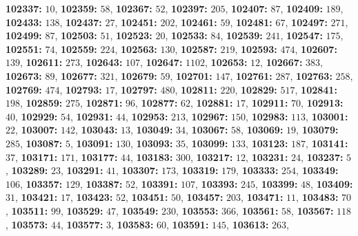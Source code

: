 \textsf{\bfseries 102337:} $10$, \textsf{\bfseries 102359:} $58$, \textsf{\bfseries 102367:} $52$, \textsf{\bfseries 102397:} $205$, \textsf{\bfseries 102407:} $87$, \textsf{\bfseries 102409:} $189$, \textsf{\bfseries 102433:} $138$, \textsf{\bfseries 102437:} $27$, \textsf{\bfseries 102451:} $202$, \textsf{\bfseries 102461:} $59$, \textsf{\bfseries 102481:} $67$, \textsf{\bfseries 102497:} $271$, \textsf{\bfseries 102499:} $87$, \textsf{\bfseries 102503:} $51$, \textsf{\bfseries 102523:} $20$, \textsf{\bfseries 102533:} $84$, \textsf{\bfseries 102539:} $241$, \textsf{\bfseries 102547:} $175$, \textsf{\bfseries 102551:} $74$, \textsf{\bfseries 102559:} $224$, \textsf{\bfseries 102563:} $130$, \textsf{\bfseries 102587:} $219$, \textsf{\bfseries 102593:} $474$, \textsf{\bfseries 102607:} $139$, \textsf{\bfseries 102611:} $273$, \textsf{\bfseries 102643:} $107$, \textsf{\bfseries 102647:} $1102$, \textsf{\bfseries 102653:} $12$, \textsf{\bfseries 102667:} $383$, \textsf{\bfseries 102673:} $89$, \textsf{\bfseries 102677:} $321$, \textsf{\bfseries 102679:} $59$, \textsf{\bfseries 102701:} $147$, \textsf{\bfseries 102761:} $287$, \textsf{\bfseries 102763:} $258$, \textsf{\bfseries 102769:} $474$, \textsf{\bfseries 102793:} $17$, \textsf{\bfseries 102797:} $480$, \textsf{\bfseries 102811:} $220$, \textsf{\bfseries 102829:} $517$, \textsf{\bfseries 102841:} $198$, \textsf{\bfseries 102859:} $275$, \textsf{\bfseries 102871:} $96$, \textsf{\bfseries 102877:} $62$, \textsf{\bfseries 102881:} $17$, \textsf{\bfseries 102911:} $70$, \textsf{\bfseries 102913:} $40$, \textsf{\bfseries 102929:} $54$, \textsf{\bfseries 102931:} $44$, \textsf{\bfseries 102953:} $213$, \textsf{\bfseries 102967:} $150$, \textsf{\bfseries 102983:} $113$, \textsf{\bfseries 103001:} $22$, \textsf{\bfseries 103007:} $142$, \textsf{\bfseries 103043:} $13$, \textsf{\bfseries 103049:} $34$, \textsf{\bfseries 103067:} $58$, \textsf{\bfseries 103069:} $19$, \textsf{\bfseries 103079:} $285$, \textsf{\bfseries 103087:} $5$, \textsf{\bfseries 103091:} $130$, \textsf{\bfseries 103093:} $35$, \textsf{\bfseries 103099:} $133$, \textsf{\bfseries 103123:} $187$, \textsf{\bfseries 103141:} $37$, \textsf{\bfseries 103171:} $171$, \textsf{\bfseries 103177:} $44$, \textsf{\bfseries 103183:} $300$, \textsf{\bfseries 103217:} $12$, \textsf{\bfseries 103231:} $24$, \textsf{\bfseries 103237:} $5$, \textsf{\bfseries 103289:} $23$, \textsf{\bfseries 103291:} $41$, \textsf{\bfseries 103307:} $173$, \textsf{\bfseries 103319:} $179$, \textsf{\bfseries 103333:} $254$, \textsf{\bfseries 103349:} $106$, \textsf{\bfseries 103357:} $129$, \textsf{\bfseries 103387:} $52$, \textsf{\bfseries 103391:} $107$, \textsf{\bfseries 103393:} $245$, \textsf{\bfseries 103399:} $48$, \textsf{\bfseries 103409:} $31$, \textsf{\bfseries 103421:} $17$, \textsf{\bfseries 103423:} $52$, \textsf{\bfseries 103451:} $50$, \textsf{\bfseries 103457:} $203$, \textsf{\bfseries 103471:} $11$, \textsf{\bfseries 103483:} $70$, \textsf{\bfseries 103511:} $99$, \textsf{\bfseries 103529:} $47$, \textsf{\bfseries 103549:} $230$, \textsf{\bfseries 103553:} $366$, \textsf{\bfseries 103561:} $58$, \textsf{\bfseries 103567:} $118$, \textsf{\bfseries 103573:} $44$, \textsf{\bfseries 103577:} $3$, \textsf{\bfseries 103583:} $60$, \textsf{\bfseries 103591:} $145$, \textsf{\bfseries 103613:} $263$, 
